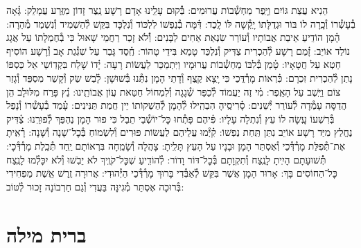 \documentclass[twoside, openany, parskip=half, 11pt]{book}
\begin{document}
הֵנִיא עֲצַת גּוֹיִם וַיָּֽפֶר מַחְשְׁ֯בוֹת עֲרוּמִים: \hfill \break
בְּ֯֗קוּם עָלֵֽינוּ אָדָם רָשָׁע נֵֽצֶר זָדוֹן מִזֶּֽרַע עֲמָלֵק: \hfill \break
גָּ֗אָה בְ֯עָשְׁ֯רוֹ וְ֯כָֽרָה לוֹ בּוֹר וּגְדֻלָּתוֹ יָֽקְ֯שָׁה לּוֹ לָֽכֶד: \hfill \break
דִּ֗מָּה בְ֯נַפְשׁוֹ לִלְכּוֹד וְ֯נִלְכָּד בִּקֵּשׁ לְ֯הַשְׁמִיד וְ֯נִשְׁמַד מְ֯הֵרָה: \hfill \break
הָ֗מָן הוֹדִֽיעַ אֵיבַת אֲבוֹתָיו וְ֯עוֹרֵר שִׂנְאַת אַחִים לַבָּנִים: \hfill \break
וְ֯֗לֹא זָכַר רַחֲמֵי שָׁאוּל כִּי בְ֯חֶמְלָתוֹ עַל אֲגָג נוֹלַד אוֹיֵב: \hfill \break
זָ֗מַם רָשָׁע לְ֯הַכְרִית צַדִּיק וְ֯נִלְכַּד טָמֵא בִּידֵי טָהוֹר: \hfill \break
חֶֽ֗סֶד גָּבַר עַל שִׁגְ֯גַת אָב וְ֯רָשָׁע הוֹסִיף חֵטְא עַל חֲטָאָיו: \hfill \break
טָ֗מַן בְּ֯לִבּוֹ מַחְשְׁ֯בוֹת עֲרוּמָיו וַיִּתְמַכֵּר לַעֲשׂוֹת רָעָה: \hfill \break
יָ֗דוֹ שָׁלַח בִּקְדֽוֹשֵי אֵל כַּסְפּוֹ נָתַן לְ֯הַכְרִית זִכְרָם: \hfill \break
כִּ֗רְאוֹת מָרְ֯דֳּכַי כִּי יָֽצָא קֶֽצֶף וְ֯דָתֵי הָמָן נִתְּ֯נוּ בְּ֯שׁוּשָׁן: \hfill \break
לָ֗בַשׁ שַׂק וְ֯קָשַׁר מִסְפֵּד וְ֯גָזַר צוֹם וַיֵּֽשֶׁב עַל הָאֵֽפֶר: \hfill \break
מִ֗י זֶה יַעֲמוֹד לְ֯כַפֵּר שְׁ֯גָגָה וְ֯לִמְחוֹל חַטַּאת עֲוֹן אֲבוֹתֵֽינוּ: \hfill \break
נֵ֗ץ פָּרַח מִלּוּלָב הֵן הֲדַסָּה עָמְ֯דָה לְ֯עוֹרֵר יְ֯שֵׁנִים: \hfill \break
סָ֗רִיסֶֽיהָ הִבְהִֽילוּ לְ֯הָמָן לְ֯הַשְׁקוֹתוֹ יֵין חֲמַת תַּנִּינִים: \hfill \break
עָ֗מַד בְ֯עָשְׁ֯רוֹ וְ֯נָפַל בְּ֯רִשְׁעוֹ עָֽשָׂה לוֹ עֵץ וְ֯נִתְלָה עָלָיו: \hfill \break
פִּ֗יהֶם פָּתְ֯חוּ כׇּל־יוֹשְׁ֯בֵי תֵבֵל כִּי פוּר הָמָן נֶהְפַּךְ לְ֯פוּרֵֽנוּ: \hfill \break
צַ֗דִּיק נֶחֱלַץ מִיַּד רָשָׁע אוֹיֵב נִתַּן תַּֽחַת נַפְשׁוֹ: \hfill \break
קִ֗יְּ֯מוּ עֲלֵיהֶם לַעֲשׂוֹת פּוּרִים וְ֯לִשְׂמוֹחַ בְּ֯כׇל־שָׁנָה וְ֯שָׁנָה: \hfill \break
רָ֗אִֽיתָ אֶת־תְּ֯פִלַּת מָרְ֯דְּ֯כַי וְ֯אֶסְתֵּר הָמָן וּבָנָיו עַל הָעֵץ תָּלִֽיתָ: \hfill \break
{}
צָהֲלָה וְ֯שָׂמֵֽחָה בִּרְאוֹתָם יַֽחַד תְּ֯כֵֽלֶת מָרְ֯דְּ֯כָי: \hfill \break
תְּ֯֗שׁוּעָתָם הָיִֽיתָ לָנֶֽצַח וְ֯תִקְוָתָם בְּ֯כׇל־דּוֹר וָדוֹר: \hfill \break
לְ֯הוֹדִֽיעַ שֶׁכׇּל־קֹוֶֽיךָ לֹא יֵבֹֽשׁוּ וְ֯לֹא יִכָּלְ֯מוּ לָנֶֽצַח כׇּל־הַחוֹסִים בָּךְ: \hfill \break
אָרוּר הָמָן אֲשֶׁר בִּקֵּשׁ לְ֯אַבְּ֯דִי בָּרוּךְ מָרְ֯דְּ֯כַי הַיְּ֯הוּדִי: \hfill \break
אֲרוּרָה זֶֽרֶשׁ אֵֽשֶׁת מַפְחִידִי בְּ֯רוּכָה אֶסְתֵּר מְ֯גִינָּה בַּעֲדִי וְ֯גַם חַרְבוֹנָה זָכוּר לְ֯טּוֹב:

\vfill


\sepline



\chapter[ברית מילה]{ ברית מילה }
\end{document}

